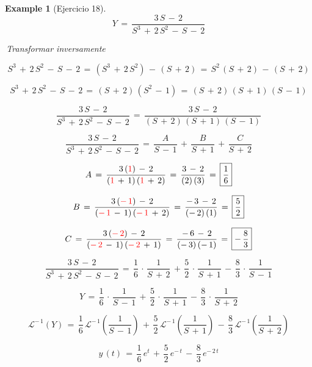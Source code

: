 \documentclass[a4paper,11pt,openany]{book}
\newtheorem{exmp}{Example}[section]
\begin{document}
\begin{exmp}[Ejercicio 18]
$$Y\,=\,\dfrac{3\,S\,-\,2}{S^{3}\,+\,2\,S^{2}\,-\,S\,-\,2}$$

\textcolor{ao(english)}{}\,Transformar inversamente

\textcolor{ao(english)}{}$$S^{3}\,+\,2\,S^{2}\,-\,S\,-\,2\,=\,(S^{3}\,+\,2\,S^{2})\,-\,(S\,+\,2)\,=\,S^{2}\,(S\,+\,2)\,-\,(S\,+\,2)$$

\textcolor{ao(english)}{}$$S^{3}\,+\,2\,S^{2}\,-\,S\,-\,2\,=\,(S\,+\,2)\,(S^{2}\,-\,1)\,=\,(S\,+\,2)\,(S\,+\,1)\,(S\,-\,1)$$

\textcolor{ao(english)}{}$$\dfrac{3\,S\,-\,2}{S^{3}\,+\,2\,S^{2}\,-\,S\,-\,2}\,=\,\dfrac{3\,S\,-\,2}{(S\,+\,2)\,(S\,+\,1)\,(S\,-\,1)}$$

\textcolor{ao(english)}{}$$\dfrac{3\,S\,-\,2}{S^{3}\,+\,2\,S^{2}\,-\,S\,-\,2}\,=\,\dfrac{A}{S\,-\,1}\,+\,\dfrac{B}{S\,+\,1}\,+\,\dfrac{C}{S\,+\,2}$$

\textcolor{ao(english)}{}$$A\,=\,\dfrac{3\,(\textcolor{red}{1})\,-\,2}{(\textcolor{red}{1}\,+\,1)\,(\textcolor{red}{1}\,+\,2)}\,=\,\dfrac{3\,-\,2}{(2)\,(3)}\,=\,\boxed{\dfrac{1}{6}}$$

\textcolor{ao(english)}{}$$B\,=\,\dfrac{3\,(\textcolor{red}{-\,1})\,-\,2}{(\textcolor{red}{-\,1}\,-\,1)\,(\textcolor{red}{-\,1}\,+\,2)}\,=\,\dfrac{-\,3\,-\,2}{(-\,2)\,(1)}\,=\,\boxed{\dfrac{5}{2}}$$

\textcolor{ao(english)}{}$$C\,=\,\dfrac{3\,(\textcolor{red}{-\,2})\,-\,2}{(\textcolor{red}{-\,2}\,-\,1)\,(\textcolor{red}{-\,2}\,+\,1)}\,=\,\dfrac{-\,6\,-\,2}{(-\,3)\,(-\,1)}\,=\,\boxed{-\,\dfrac{8}{3}}$$

\textcolor{ao(english)}{}$$\dfrac{3\,S\,-\,2}{S^{3}\,+\,2\,S^{2}\,-\,S\,-\,2}\,=\,\dfrac{1}{6}\,\cdot\,\dfrac{1}{S\,+\,2}\,+\,\dfrac{5}{2}\,\cdot\,\dfrac{1}{S\,+\,1}\,-\,\dfrac{8}{3}\,\cdot\,\dfrac{1}{S\,-\,1}$$

\textcolor{ao(english)}{}$$Y\,=\,\dfrac{1}{6}\,\cdot\,\dfrac{1}{S\,-\,1}\,+\,\dfrac{5}{2}\,\cdot\,\dfrac{1}{S\,+\,1}\,-\,\dfrac{8}{3}\,\cdot\,\dfrac{1}{S\,+\,2}$$

$$\mathcal{L}^{-\,1}\left(Y\right)\,=\,\dfrac{1}{6}\,\mathcal{L}^{-\,1}\left(\dfrac{1}{S\,-\,1}\right)\,+\,\dfrac{5}{2}\,\mathcal{L}^{-\,1}\left(\dfrac{1}{S\,+\,1}\right)\,-\,\dfrac{8}{3}\,\mathcal{L}^{-\,1}\left(\dfrac{1}{S\,+\,2}\right)$$

$$\boxed{y\,(t)\,=\,\dfrac{1}{6}\,e^{t}\,+\,\dfrac{5}{2}\,e^{-\,t}\,-\,\dfrac{8}{3}\,e^{-\,2\,t}}$$

\end{exmp}
 
\end{document}
